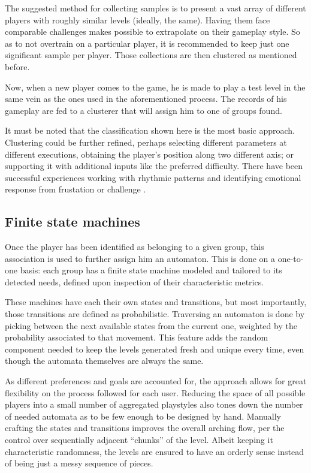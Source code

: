 \documentclass[conference]{IEEEtran}
\begin{document}
The suggested method for collecting samples is to present a vast array of different players with roughly similar levels (ideally, the same). Having them face comparable challenges makes possible to extrapolate on their gameplay style. So as to not overtrain on a particular player, it is recommended to keep just one significant sample per player. Those collections are then clustered as mentioned before.

Now, when a new player comes to the game, he is made to play a test level in the same vein as the ones used in the aforementioned process. The records of his gameplay are fed to a clusterer that will assign him to one of groups found.

It must be noted that the classification shown here is the most basic approach. Clustering could be further refined, perhaps selecting different parameters at different executions, obtaining the player's position along two different axis; or supporting it with additional inputs like the preferred difficulty. There have been successful experiences working with rhythmic patterns \cite{rhythm09} and identifying emotional response from frustation or challenge \cite{shaker10}.

\subsection{Finite state machines}

Once the player has been identified as belonging to a given group, this association is used to further assign him an automaton. This is done on a one-to-one basis: each group has a finite state machine modeled and tailored to its detected needs, defined upon inspection of their characteristic metrics.

These machines have each their own states and transitions, but most importantly, those transitions are defined as probabilistic. Traversing an automaton is done by picking between the next available states from the current one, weighted by the probability associated to that movement. This feature adds the random component needed to keep the levels generated fresh and unique every time, even though the automata themselves are always the same.

As different preferences and goals are accounted for, the approach allows for great flexibility on the process followed for each user. Reducing the space of all possible players into a small number of aggregated playstyles also tones down the number of needed automata as to be few enough to be designed by hand. Manually crafting the states and transitions improves the overall arching flow, per the control over sequentially adjacent ``chunks'' of the level. Albeit keeping it characteristic randomness, the levels are ensured to have an orderly sense instead of being just a messy sequence of pieces.
\end{document}
